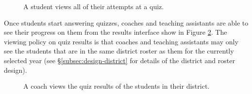 \begin{figure}[h!]
	\centering
	\caption{A student views all of their attempts at a quiz.}
	\label{fig:screens-quiz-attempt-list}
\end{figure}

Once students start answering quizzes, coaches and teaching assistants are able to see their progress on them from the results interface show in Figure \ref{fig:screens-quiz-results-list}. The viewing policy on quiz results is that coaches and teaching assistants may only see the students that are in the same district roster as them for the currently selected year (see \S \ref{subsec:design-district} for details of the district and roster design).

\begin{figure}[h!]
	\centering
	\caption{A coach views the quiz results of the students in their district.}
	\label{fig:screens-quiz-results-list}
\end{figure}

